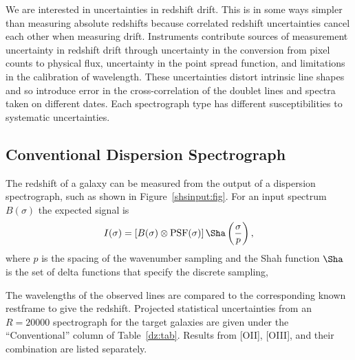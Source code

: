 \documentclass[preprint2, 10pt]{aastex}
\begin{document}
We are interested in uncertainties in redshift drift.
This is in some ways simpler than measuring absolute redshifts
because correlated redshift uncertainties cancel each other when measuring drift.
Instruments contribute sources of measurement uncertainty in redshift drift through 
uncertainty in the conversion from pixel counts to physical flux, uncertainty in the point spread function,
and limitations in the calibration
of wavelength.   These uncertainties distort intrinsic line shapes and so introduce error in the cross-correlation
of the doublet lines and spectra taken on different dates. 
Each spectrograph type
has different susceptibilities to systematic uncertainties.


\subsection{Conventional Dispersion Spectrograph} 

The redshift of a galaxy can be measured from the output of a dispersion spectrograph, such as shown in Figure~\ref{shsinput:fig}.
For an input spectrum $B(\sigma)$ the expected signal is
\begin{equation}
I(\sigma) = \left[B(\sigma)\otimes \mbox{PSF}(\sigma)\right]\Sha\left(\frac{\sigma}{p}\right),
\label{conventional:eqn}
\end{equation}
where $p$ is the spacing of the wavenumber sampling and the Shah function $\Sha$ is the set of delta functions
that specify the discrete sampling,

The wavelengths of the observed lines are compared to the corresponding known restframe to give
the redshift.
Projected statistical uncertainties from an $R=20000$ spectrograph for the target galaxies are given under
the ``Conventional'' column of Table~\ref{dz:tab}.  Results from [OII], [OIII], and their combination are listed separately.
\end{document}
